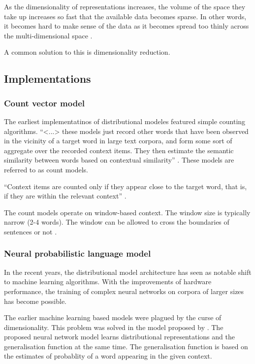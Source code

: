 \documentclass[14pt, a4paper]{extreport}
\begin{document}
As the dimensionality of representations increases, the volume of the space they take up increases so fast that the available data becomes sparse. In other words, it becomes hard to make sense of the data as it becomes spread too thinly across the multi-dimensional space \parencite{venkat}.

A common solution to this is dimensionality reduction.
\subsection{Implementations}

\subsubsection{Count vector model}
The earliest implementatinos of distributional modeles featured simple counting algorithms. ``<...> these models just record other words that have been observed in the vicinity of a target word in large text corpora, and form some sort of aggregate over the recorded context items. They then estimate the semantic similarity between words based on contextual similarity'' \parencite{erkkatrin2}. These models are referred to as count models.

``Context items are counted only if they appear close to the target word, that is, if they are within the relevant context'' \parencite{erkkatrin2}.

The count models operate on window-based context. The window size is typically narrow (2-4 words). The window can be allowed to cross the boundaries of sentences or not \parencite{baroni}.

\subsubsection{Neural probabilistic language model}
In the recent years, the distributional model architecture has seen as notable shift to machine learning algorithms. With the improvements of hardware performance, the training of complex neural networks on corpora of larger sizes has become possible.

The earlier machine learning based models were plagued by the curse of dimensionality. This problem was solved in the model proposed by \parencite{bengio}. The proposed neural network model learns distributional representations and the generalisation function at the same time. The generalisation function is based on the estimates of probablity of a word appearing in the given context.
\end{document}

